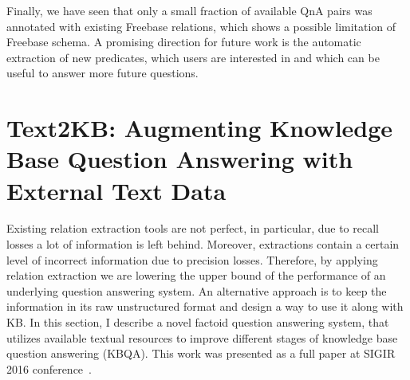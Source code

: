Finally, we have seen that only a small fraction of available QnA pairs was annotated with existing Freebase relations, which shows a possible limitation of Freebase schema.
A promising direction for future work is the automatic extraction of new predicates, which users are interested in and which can be useful to answer more future questions.





\section{Text2KB: Augmenting Knowledge Base Question Answering with External Text Data}
\label{section:factoid:text2kb}

Existing relation extraction tools are not perfect, in particular, due to recall losses a lot of information is left behind.
Moreover, extractions contain a certain level of incorrect information due to precision losses.
Therefore, by applying relation extraction we are lowering the upper bound of the performance of an underlying question answering system.
An alternative approach is to keep the information in its raw unstructured format and design a way to use it along with KB.
In this section, I describe a novel factoid question answering system, that utilizes available textual resources to improve different stages of knowledge base question answering (KBQA).
This work was presented as a full paper at SIGIR 2016 conference~\cite{Savenkov:2016:KBE:2911451.2911536}.

